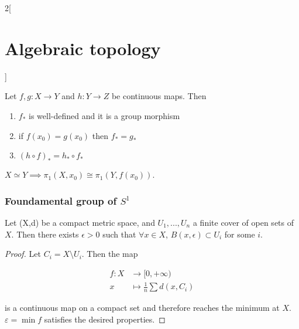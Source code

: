 \documentclass[../../../main.tex]{subfiles}
\begin{document}
\begin{multicols}{2}[\section{Algebraic topology}]
\begin{definition}
	\end{definition}

	\begin{proposition}
		Let $f,g:X\to Y$ and $h:Y \to Z $ be continuous maps. Then
		\begin{enumerate}
			\item $f_*$ is well-defined and it is a group morphism
			\item if $f(x_0)=g(x_0)$ then $f_*=g_*$
			\item $(h\circ f)_*=h_*\circ f_*$
		\end{enumerate}
	\end{proposition}

	\begin{corollary}
		$X\simeq Y \implies \pi_1 (X,x_0) \cong \pi_1 (Y,f(x_0))$.
	\end{corollary}


	\subsubsection{Foundamental group of $S^1$}
	
	\begin{lemma}
		Let (X,d) be a compact metric space, and $U_1, ..., U_n$ a finite cover of open sets of $X$. Then there exists $\epsilon>0$ such that $\forall x \in X$, $B(x,\epsilon)\subset U_i$ for some $i$.
	\end{lemma}

	\begin{proof}
		Let $C_i=X\setminus U_i$.  Then the map 
		
		\begin{align*}			
			f:X &\longrightarrow [0, +\infty) \\
			x &\longmapsto \frac{1}{n} \sum d(x,C_i)			
		\end{align*}
		
		is a continuous map on a compact set and therefore reaches the minimum at $X$. $\varepsilon=\min f$ satisfies the desired properties.
	\end{proof}
	

\end{multicols}
\end{document}
